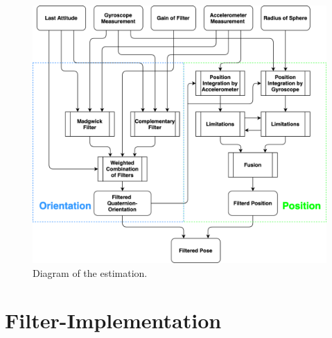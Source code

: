 \documentclass[letterpaper, 10 pt, conference]{ieeeconf}  %
\begin{document}
\begin{figure}[hb]
\includegraphics[width=\linewidth]{./graphics/imuJasperChartSimliefiedBIG.png}
\caption{Diagram of the estimation.}
\label{generalized}
\end{figure}

\section{Filter-Implementation}
\end{document}
